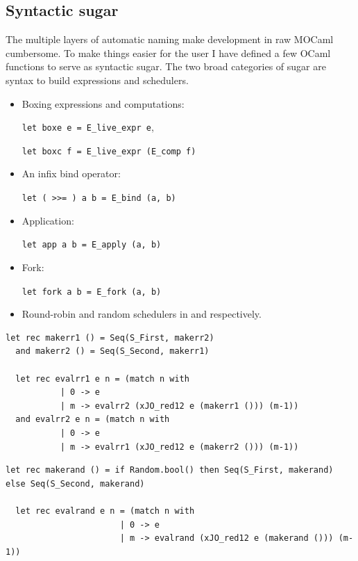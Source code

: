 \documentclass[12pt,twoside,notitlepage]{report}
\theoremstyle{plain}%
\theoremstyle{definition}
\theoremstyle{remark}
\begin{document}
\subsection{Syntactic sugar}
The multiple layers of automatic naming make development in raw MOCaml cumbersome.  To make things easier for the user I have defined a few OCaml functions to serve as syntactic sugar. The two broad categories of sugar are syntax to build expressions and schedulers. 
\begin{itemize}
\item{Boxing expressions and computations:

 \lstinline|let boxe e = E_live_expr e|,
 
 
 \lstinline|let boxc f = E_live_expr (E_comp f)|}
\item{An infix bind operator:


 \lstinline|let ( >>= ) a b = E_bind (a, b)|}
\item{Application:


 \lstinline|let app a b = E_apply (a, b)|}
\item{Fork:


 \lstinline|let fork a b = E_fork (a, b)|}
\item{Round-robin and random schedulers in  and  respectively.\label{sec:random_sched}}
\end{itemize}
\begin{minipage}{\linewidth}

\begin{lstlisting}[caption={OCaml round-robin scheduler}, label={lst:ocamlrrsched}]
  let rec makerr1 () = Seq(S_First, makerr2) 
  and makerr2 () = Seq(S_Second, makerr1) 
  
  let rec evalrr1 e n = (match n with 
           | 0 -> e
           | m -> evalrr2 (xJO_red12 e (makerr1 ())) (m-1))
  and evalrr2 e n = (match n with 
           | 0 -> e
           | m -> evalrr1 (xJO_red12 e (makerr2 ())) (m-1))
\end{lstlisting}

\end{minipage}
\begin{minipage}{\linewidth}

\begin{lstlisting}[caption={OCaml random scheduler}, label={lst:ocamlrandsched}]
  let rec makerand () = if Random.bool() then Seq(S_First, makerand) else Seq(S_Second, makerand)
  
  let rec evalrand e n = (match n with 
                       | 0 -> e
                       | m -> evalrand (xJO_red12 e (makerand ())) (m-1))
\end{lstlisting}

\end{minipage}
\end{document}
